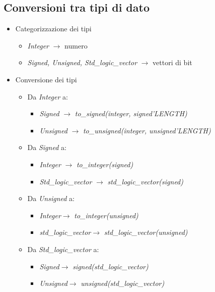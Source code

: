 \documentclass{article}
\begin{document}
\subsection{Conversioni tra tipi di dato}
\begin{itemize}
	\item Categorizzazione dei tipi
	\begin{itemize}
		\item \textit{Integer} \(\rightarrow\) numero
		\item \textit{Signed, Unsigned, Std\_logic\_vector} \(\rightarrow\) vettori di bit
	\end{itemize}
	\item Conversione dei tipi
	\begin{itemize}
	\item Da \textit{Integer} a:
	\begin{itemize}
		\item \textit{Signed} \(\rightarrow\) \textit{to\_signed(integer, signed'LENGTH)}
		\item \textit{Unsigned} \(\rightarrow\) \textit{to\_unsigned(integer, unsigned'LENGTH)}
	\end{itemize}
	\item Da \textit{Signed} a:
	\begin{itemize}
		\item \textit{Integer} \(\rightarrow\) \textit{to\_integer(signed)}
		\item \textit{Std\_logic\_vector} \(\rightarrow\) \textit{std\_logic\_vector(signed)}
	\end{itemize}
	\item Da \textit{Unsigned} a:
	\begin{itemize}
		\item \textit{Integer}\(\rightarrow\) \textit{to\_integer(unsigned)}
		\item \textit{std\_logic\_vector}\(\rightarrow\) \textit{std\_logic\_vector(unsigned)}
	\end{itemize}
	\item Da \textit{Std\_logic\_vector} a:
	\begin{itemize}
		\item \textit{Signed}\(\rightarrow\) \textit{signed(std\_logic\_vector)}
		\item \textit{Unsigned}\(\rightarrow\) \textit{unsigned(std\_logic\_vector)}
	\end{itemize}
\end{itemize}
	\end{itemize}
\end{document}
